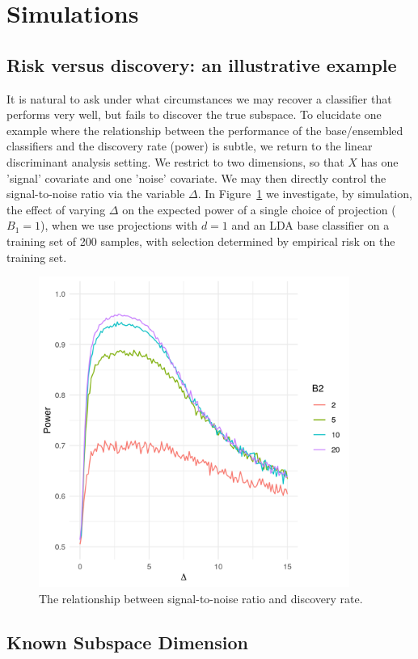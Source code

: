 \documentclass[12pt]{article}
\begin{document}
\section{Simulations}
\subsection{Risk versus discovery: an illustrative example}
It is natural to ask under what circumstances we may recover a classifier that performs very well, but fails to discover the true subspace. To elucidate one example where the relationship between the performance of the base/ensembled classifiers and the discovery rate (power) is subtle, we return to the linear discriminant analysis setting. We restrict to two dimensions, so that $X$ has one 'signal' covariate and one 'noise' covariate. We may then directly control the signal-to-noise ratio via the variable $\Delta$. In Figure~\ref{fig:ChangingDelta} we investigate, by simulation, the effect of varying $\Delta$ on the expected power of a single choice of projection ($B_1 = 1$), when we use projections with $d=1$ and an LDA base classifier on a training set of 200 samples, with selection determined by empirical risk on the training set. 

\begin{figure}[htbp]
    \centering
    \includegraphics[width=4in]{../results/figures/ChangingDelta.png}
    \caption{The relationship between signal-to-noise ratio and discovery rate.\label{fig:ChangingDelta}}
\end{figure}

\subsection{Known Subspace Dimension}
\end{document}
